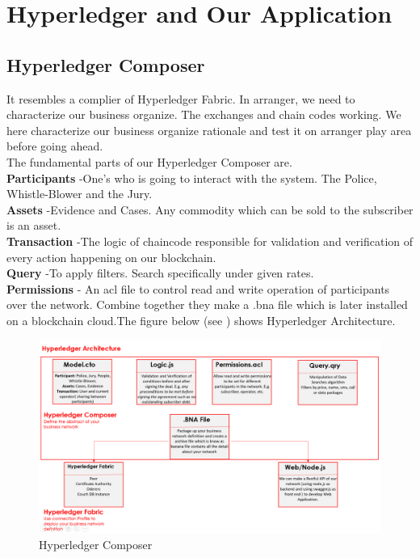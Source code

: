 \section{Hyperledger and Our Application }
\subsection{Hyperledger Composer}
It resembles a complier of Hyperledger Fabric. In arranger, we need to characterize our business organize. The exchanges and chain codes working. We here characterize our business organize rationale and test it on arranger play area before going ahead. \\
The fundamental parts of our Hyperledger Composer are.\\
\textbf{ Participants  }-One’s who is going to interact with the system. The Police, Whistle-Blower and the Jury.\\
\textbf{ 	Assets   }-Evidence and Cases. Any commodity which can be sold to the subscriber is an asset.\\
\textbf{ 	Transaction   }-The logic of chaincode responsible for validation and verification of every action happening on our blockchain.\\  
\textbf{ Query  }-To apply filters. Search specifically under given rates.\\
\textbf{ 	Permissions   }- An acl file to control read and write operation of participants over the network.
Combine together they make a .bna file which is later installed on a blockchain cloud.The figure below (see ) shows Hyperledger Architecture.\\
\begin{figure}[h]
	\centering
	\includegraphics[scale=0.40]{figures/05.png}
	\caption{Hyperledger Composer }
	\label{fig:istg}
\end{figure}

